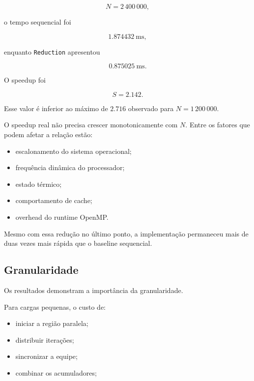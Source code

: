 \begin{equation}
    N=2\,400\,000,
\end{equation}

o tempo sequencial foi

\begin{equation}
    1.874432\ \text{ms},
\end{equation}

enquanto \texttt{Reduction} apresentou

\begin{equation}
    0.875025\ \text{ms}.
\end{equation}

O speedup foi

\begin{equation}
    S=2.142.
\end{equation}

Esse valor é inferior ao máximo de \(2.716\) observado para
\(N=1\,200\,000\).

O speedup real não precisa crescer monotonicamente com \(N\). Entre os
fatores que podem afetar a relação estão:

\begin{itemize}
    \item escalonamento do sistema operacional;
    \item frequência dinâmica do processador;
    \item estado térmico;
    \item comportamento de cache;
    \item overhead do runtime OpenMP.
\end{itemize}

Mesmo com essa redução no último ponto, a implementação permaneceu mais de
duas vezes mais rápida que o baseline sequencial.


\subsection{Granularidade}

Os resultados demonstram a importância da granularidade.

Para cargas pequenas, o custo de:

\begin{itemize}
    \item iniciar a região paralela;
    \item distribuir iterações;
    \item sincronizar a equipe;
    \item combinar os acumuladores;
\end{itemize}

